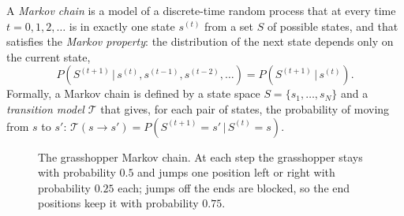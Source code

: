 \documentclass[11pt, oneside]{book}
\newcommand{\Prob}{\mathbb{P}}           %
\newcommand{\given}{\,\vert\,}           %
\begin{document}
\begin{defbox}[title={Markov chain}]
A \emph{Markov chain} is a model of a discrete-time random process that at
every time $t = 0, 1, 2, \ldots$ is in exactly one state $s^{(t)}$ from a set
$S$ of possible states, and that satisfies the \emph{Markov property}: the
distribution of the next state depends only on the current state,
\[
P(S^{(t+1)} \given s^{(t)}, s^{(t-1)}, s^{(t-2)}, \ldots) = P(S^{(t+1)} \given s^{(t)}).
\]
Formally, a Markov chain is defined by a state space $S = \{s_1, \ldots,
s_N\}$ and a \emph{transition model} $\mathcal{T}$ that gives, for each pair
of states, the probability of moving from $s$ to $s'$:
$\mathcal{T}(s \to s') = P(S^{(t+1)} = s' \given S^{(t)} = s)$.
\end{defbox}

\begin{figure}[htbp]
\centering
{}
\caption{The grasshopper Markov chain. At each step the grasshopper stays
with probability $0.5$ and jumps one position left or right with probability
$0.25$ each; jumps off the ends are blocked, so the end positions keep it with
probability $0.75$.}
\label{fig:grasshopper}
\end{figure}
\end{document}
